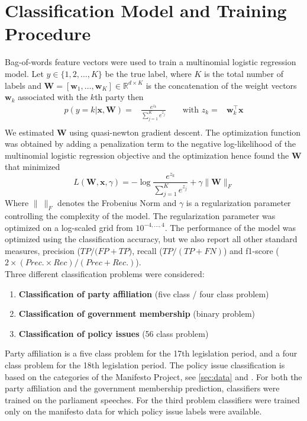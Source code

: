 \documentclass{article}
\renewcommand{\vec}[1]{\mathbf{#1}}
\newcommand{\R}{\mathds{R}}
\begin{document}
\section{Classification Model and Training Procedure}\label{sec:model}
Bag-of-words feature vectors were used to train a multinomial logistic regression model. Let $y\in\{1,2,\dots,K\}$ be the true  label, where $K$ is the total number of labels and $\vec{W}=[\vec{w}_1,\dots,\vec{w}_K]\in\R^{d\times K}$ is the concatenation of the weight vectors $\vec{w}_k$ associated with the $k$th party then
\begin{eqnarray}\label{eq:logreg_multiclass}
p(y=k|\vec{x},\vec{W}) = &\frac{e^{z_k}}{\sum_{j=1}^K e^{z_j}} \qquad \textrm{with }  z_k=&\vec{w}_k^{\top}\vec{x} \\\nonumber
\end{eqnarray}
%
We estimated $\vec{W}$ using quasi-newton gradient descent. The optimization function was obtained by adding a penalization term to the negative log-likelihood of the multinomial logistic regression objective and the optimization hence found the $\vec{W}$ that minimized
\begin{equation}\label{eq:objective}
L(\vec{W}, \vec{x}, \gamma) = - \log{\frac{e^{z_k}}{\sum_{j=1}^K e^{z_j}}}+ \gamma \| \vec{W} \|_{F}
\end{equation}
Where $\|~\|_F$ denotes the Frobenius Norm and $\gamma$ is a regularization parameter controlling the complexity of the model.
The regularization parameter was optimized on a log-scaled grid from $10^{-4,\dots,4}$. The performance of the model was optimized using the classification accuracy, but we also report all other standard measures, precision ($TP / (FP + TP$), recall ($TP / (TP + FN)$) and f1-score ($2\times (Prec. \times Rec) / (Prec + Rec.)$). \\

Three different classification problems were considered:
\begin{enumerate}
\item {\bf Classification of party affiliation} (five class / four class problem)
\item {\bf Classification of government membership} (binary problem)
\item {\bf Classification of policy issues} (56 class problem)
\end{enumerate}

Party affiliation is a five class problem for the 17th legislation period, and a four class problem for the 18th legislation period. The policy issue classification is based on the categories of the Manifesto Project, see \autoref{sec:data} and \cite{leftright}.
For both the party affiliation and the government membership prediction, classifiers were trained on the parliament speeches. For the third problem classifiers were trained only on the manifesto data for which policy issue labels were available.
\end{document}
